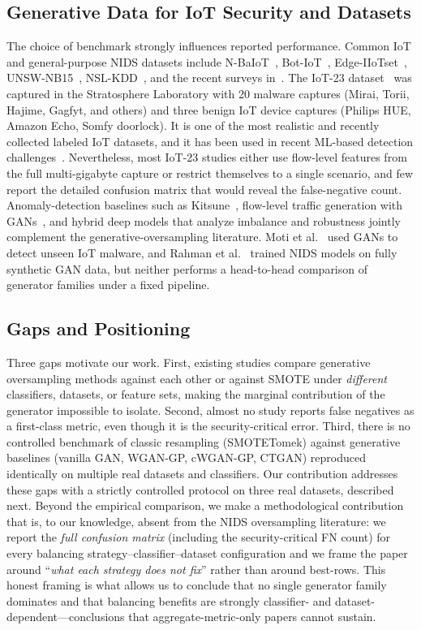 ﻿\documentclass[journal]{IEEEtran}
\begin{document}
\subsection{Generative Data for IoT Security and Datasets}
The choice of benchmark strongly influences reported performance. Common IoT and general-purpose NIDS datasets include N-BaIoT~\cite{meidan2018nbahot}, Bot-IoT~\cite{koroniotis2019botiot}, Edge-IIoTset~\cite{ferrag2022edgeiiotset}, UNSW-NB15~\cite{moustafa2015unsw}, NSL-KDD~\cite{tavallaee2009nslkdd}, and the recent surveys in~\cite{ring2019survey,khraisat2019survey}. The IoT-23 dataset~\cite{garcia2020iot23} was captured in the Stratosphere Laboratory with 20 malware captures (Mirai, Torii, Hajime, Gagfyt, and others) and three benign IoT device captures (Philips HUE, Amazon Echo, Somfy doorlock). It is one of the most realistic and recently collected labeled IoT datasets, and it has been used in recent ML-based detection challenges~\cite{moti2021ganiot}. Nevertheless, most IoT-23 studies either use flow-level features from the full multi-gigabyte capture or restrict themselves to a single scenario, and few report the detailed confusion matrix that would reveal the false-negative count. Anomaly-detection baselines such as Kitsune~\cite{mirsky2018kitsune}, flow-level traffic generation with GANs~\cite{ring2019flowgan}, and hybrid deep models that analyze imbalance and robustness jointly~\cite{wang2023hybrid} complement the generative-oversampling literature. Moti et al.~\cite{moti2021ganiot} used GANs to detect unseen IoT malware, and Rahman et al.~\cite{rahman2024syngan} trained NIDS models on fully synthetic GAN data, but neither performs a head-to-head comparison of generator families under a fixed pipeline.

\subsection{Gaps and Positioning}
Three gaps motivate our work. First, existing studies compare generative oversampling methods against each other or against SMOTE under \emph{different} classifiers, datasets, or feature sets, making the marginal contribution of the generator impossible to isolate. Second, almost no study reports false negatives as a first-class metric, even though it is the security-critical error. Third, there is no controlled benchmark of classic resampling (SMOTETomek) against generative baselines (vanilla GAN, WGAN-GP, cWGAN-GP, CTGAN) reproduced identically on multiple real datasets and classifiers. Our contribution addresses these gaps with a strictly controlled protocol on three real datasets, described next. Beyond the empirical comparison, we make a methodological contribution that is, to our knowledge, absent from the NIDS oversampling literature: we report the \emph{full confusion matrix} (including the security-critical FN count) for every balancing strategy--classifier--dataset configuration and we frame the paper around ``\emph{what each strategy {\color{black}does not} fix}'' rather than around best-rows. This honest framing is what allows us to conclude that no single generator family dominates and that balancing benefits are strongly classifier- and dataset-dependent---conclusions that aggregate-metric-only papers cannot sustain.
\end{document}

